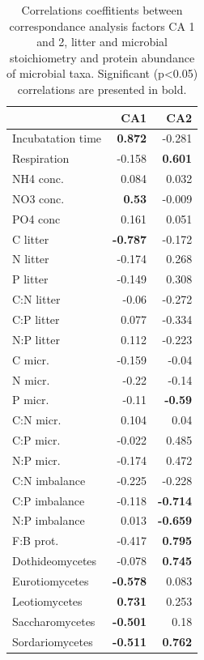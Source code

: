 \documentclass[10pt]{article}
\begin{document}
\begin{flushleft}
\begin{table}[h!]
\begin{center}
\caption{Correlations coeffitients between correspondance analysis factors CA 1 and 2, litter and microbial stoichiometry and protein abundance of microbial taxa. Significant (p\textless 0.05) correlations are presented in bold.}
\label{catab}
{\small
\begin{tabular}{lrr}
  \hline
 & CA1 & CA2 \\ 
  \hline
Incubatation time & \textbf{0.872} & -0.281 \\ 
  Respiration & -0.158 & \textbf{0.601} \\ 
  NH4 conc. & 0.084 & 0.032 \\ 
  NO3 conc. & \textbf{0.53} & -0.009 \\ 
  PO4 conc & 0.161 & 0.051 \\ 
  C litter & \textbf{-0.787} & -0.172 \\ 
  N litter & -0.174 & 0.268 \\ 
  P litter & -0.149 & 0.308 \\ 
  C:N litter & -0.06 & -0.272 \\ 
  C:P litter & 0.077 & -0.334 \\ 
  N:P litter & 0.112 & -0.223 \\ 
  C micr. & -0.159 & -0.04 \\ 
  N micr. & -0.22 & -0.14 \\ 
  P micr. & -0.11 & \textbf{-0.59} \\ 
  C:N micr. & 0.104 & 0.04 \\ 
  C:P micr. & -0.022 & 0.485 \\ 
  N:P micr. & -0.174 & 0.472 \\ 
  C:N imbalance & -0.225 & -0.228 \\ 
  C:P imbalance & -0.118 & \textbf{-0.714} \\ 
  N:P imbalance & 0.013 & \textbf{-0.659} \\ 
  F:B prot. & -0.417 & \textbf{0.795} \\ 
  Dothideomycetes & -0.078 & \textbf{0.745} \\ 
  Eurotiomycetes & \textbf{-0.578} & 0.083 \\ 
  Leotiomycetes & \textbf{0.731} & 0.253 \\ 
  Saccharomycetes & \textbf{-0.501} & 0.18 \\ 
  Sordariomycetes & \textbf{-0.511} & \textbf{0.762} \\ 

\end{tabular}}
\end{center}
\end{table}
\end{flushleft}
\end{document}

